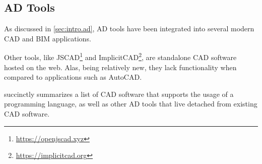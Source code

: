 \subsection{\acl{AD} Tools}%
\label{sec:related.ad}

As discussed in \cref{sec:intro.ad}, \ac{AD} tools have been integrated into
several modern \ac{CAD} and \ac{BIM} applications.

Other tools, like JSCAD\footnote{\url{https://openjscad.xyz}} and
ImplicitCAD\footnote{\url{https://implicitcad.org}}, are standalone \ac{CAD}
software hosted on the web.  Alas, being relatively new, they lack functionality
when compared to applications such as AutoCAD\@.

 succinctly summarizes a list of \ac{CAD} software
that supports the usage of a programming language, as well as other \ac{AD}
tools that live detached from existing \ac{CAD} software.


